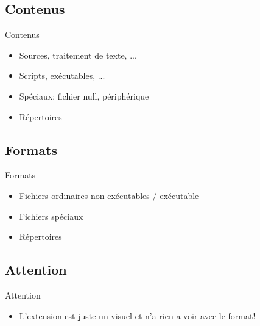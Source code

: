 \begin{frame}{\sectitle}
\def\subsectitle{Format de fichiers}

\def\subsectitle{}
\subsection{\subsectitle}

\def\subsectitle{Contenus}
\subsection{\subsectitle}
\begin{exampleblock}{\subsectitle}
\begin{itemize}
    \item Sources, traitement de texte, ...
    \item Scripts, exécutables, ...
    \item Spéciaux: fichier null, périphérique
    \item Répertoires
\end{itemize}
\end{exampleblock}

\def\subsectitle{Formats}
\subsection{\subsectitle}
\begin{block}{\subsectitle}
\begin{itemize}
    \item Fichiers ordinaires non-exécutables / exécutable
    \item Fichiers spéciaux
    \item Répertoires
\end{itemize}
\end{block}

\def\subsectitle{Attention}
\subsection{\subsectitle}
\begin{alertblock}{\subsectitle}
\begin{itemize}
    \item L'extension est juste un visuel et n'a rien a voir avec le format!
\end{itemize}
\end{alertblock}

\end{frame}

